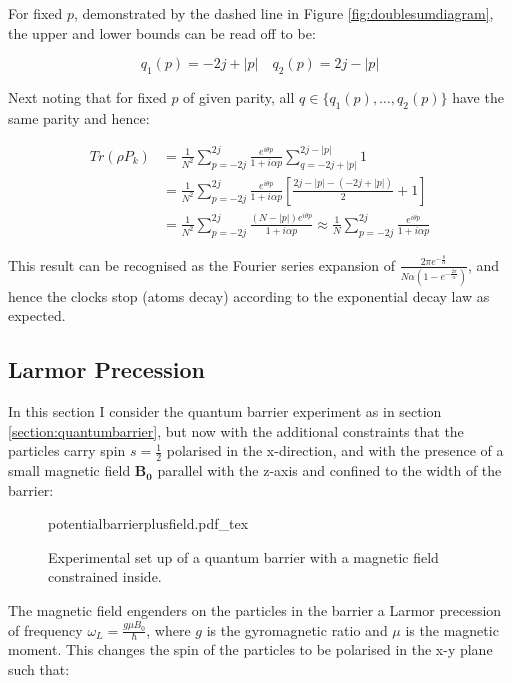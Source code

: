 \documentclass{article}
\newcommand{\incfig}[1]{%
    \def\svgwidth{10cm}
    {#1.pdf_tex}
}
\begin{document}
\noindent For fixed $p$, demonstrated by the dashed line in Figure \ref{fig:doublesumdiagram}, the upper and lower bounds can be read off to be:

\begin{equation}
	q_1(p)=-2j+|p| \quad q_2(p)=2j-|p|
\end{equation}

\noindent Next noting that for fixed $p$ of given parity, all $q \in \{q_1(p),\dots,q_2(p)\}$ have the same parity and hence:

\begin{align}
	Tr(\rho P_k) &= \frac{1}{N^2}\sum_{p=-2j}^{2j}\frac{e^{i\theta p}}{1+i\alpha p}\sum_{q=-2j+|p|}^{2j-|p|}1 \\
		     &= \frac{1}{N^2}\sum_{p=-2j}^{2j}\frac{e^{i\theta p}}{1+i\alpha p}\left[\frac{2j-|p|-(-2j+|p|)}{2}+1\right] \\
		     &= \frac{1}{N^2}\sum_{p=-2j}^{2j}\frac{(N-|p|)e^{i\theta p}}{1+i\alpha p} \approx \frac{1}{N}\sum_{p=-2j}^{2j}\frac{e^{i\theta p}}{1+i\alpha p}
\end{align}

\noindent This result can be recognised as the Fourier series expansion of $\frac{2\pi e^{-\frac{\theta}{\alpha}}}{N\alpha\left(1-e^{-\frac{2\pi}{\alpha}}\right)}$, and hence the clocks stop (atoms decay) according to the exponential decay law as expected.

\subsection{Larmor Precession}
In this section I consider the quantum barrier experiment as in section \ref{section:quantumbarrier}, but now with the additional constraints that the particles carry spin $s=\frac{1}{2}$ polarised in the x-direction, and with the presence of a small magnetic field $\boldsymbol{B_0}$ parallel with the z-axis and confined to the width of the barrier:

\begin{figure}[ht]
    \centering
    \incfig{potentialbarrierplusfield}
    \caption{Experimental set up of a quantum barrier with a magnetic field constrained inside.}
    \label{fig:potentialbarrierfield}
\end{figure}

\noindent The magnetic field engenders on the particles in the barrier a Larmor precession of frequency $\omega_L = \frac{g\mu B_0}{\hbar}$, where $g$ is the gyromagnetic ratio and $\mu$ is the magnetic moment. This changes the spin of the particles to be polarised in the x-y plane such that:
\end{document}
